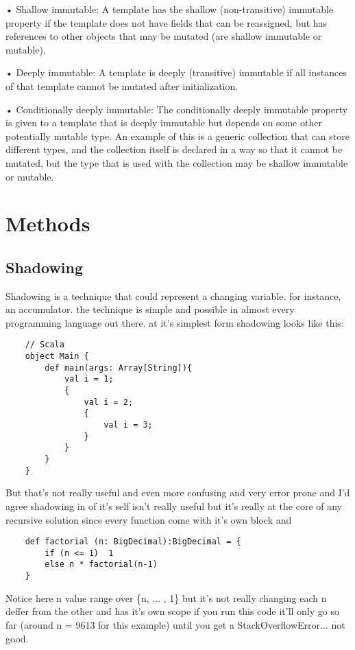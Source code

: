 \documentclass[conference]{IEEEtran}
\begin{document}
• Shallow immutable: A template has the shallow (non-transitive) immutable property if the template does not have fields that can be reassigned, but has references to other objects that may be mutated (are shallow immutable or mutable).

• Deeply immutable: A template is deeply (transitive) immutable if all instances of that template cannot be mutated after initialization.

• Conditionally deeply immutable: The conditionally deeply immutable property is given to a template that is deeply immutable but depends on some other potentially mutable type. An example of this is a generic collection that can store different types, and the collection itself is declared in a way so that it cannot be mutated, but the type that is used with the collection may be shallow immutable or mutable.

\section{Methods}

\subsection{Shadowing}

Shadowing is a technique that could represent a changing variable. for instance, an accumulator. the technique is simple and possible in almost every programming language out there.
at it's simplest form shadowing looks like this:
\begin{lstlisting}
    // Scala  
    object Main {
        def main(args: Array[String]){
            val i = 1;
            {
                val i = 2;
                {
                    val i = 3;
                }
            }
        }  
    }    
\end{lstlisting}
But that's not really useful and even more confusing and very error prone and I'd agree shadowing in of it's self isn't really useful but it's really at the core of any recursive solution since every function come with it's own block and 
\begin{lstlisting} 
    def factorial (n: BigDecimal):BigDecimal = {
        if (n <= 1)  1
        else n * factorial(n-1)
    }
\end{lstlisting}
Notice here n value range over \{n, ... , 1\} but it's not really changing each n deffer from the other and has it's own scope
if you run this code it'll only go so far (around  n = 9613 for this example) until you get a StackOverflowError... not good.
\end{document}
